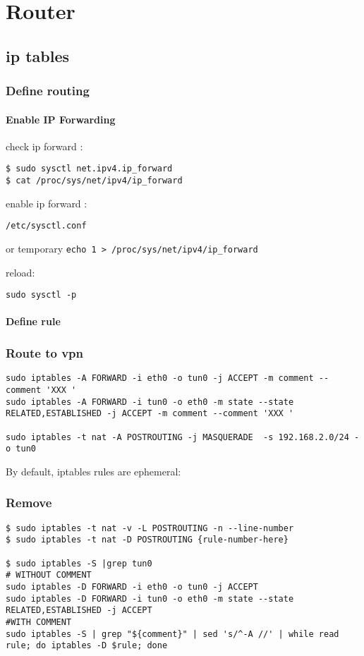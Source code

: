 \chapter{Router}

\section{ip tables}
\subsection{Define routing}
\subsubsection{Enable IP Forwarding}
check ip forward :
\begin{verbatim}
$ sudo sysctl net.ipv4.ip_forward
$ cat /proc/sys/net/ipv4/ip_forward
\end{verbatim}


enable ip forward :

\begin{verbatim}
/etc/sysctl.conf
\end{verbatim}


or temporary \verb+echo 1 > /proc/sys/net/ipv4/ip_forward+

reload:
\begin{verbatim}
sudo sysctl -p
\end{verbatim}


\subsubsection{Define rule}

\subsection{Route to vpn}
\begin{verbatim}
sudo iptables -A FORWARD -i eth0 -o tun0 -j ACCEPT -m comment --comment 'XXX '
sudo iptables -A FORWARD -i tun0 -o eth0 -m state --state RELATED,ESTABLISHED -j ACCEPT -m comment --comment 'XXX '

sudo iptables -t nat -A POSTROUTING -j MASQUERADE  -s 192.168.2.0/24 -o tun0 
\end{verbatim}

By default, iptables rules are ephemeral:

\subsection{Remove}
\begin{verbatim}
$ sudo iptables -t nat -v -L POSTROUTING -n --line-number
$ sudo iptables -t nat -D POSTROUTING {rule-number-here}

$ sudo iptables -S |grep tun0
# WITHOUT COMMENT
sudo iptables -D FORWARD -i eth0 -o tun0 -j ACCEPT
sudo iptables -D FORWARD -i tun0 -o eth0 -m state --state RELATED,ESTABLISHED -j ACCEPT
#WITH COMMENT
sudo iptables -S | grep "${comment}" | sed 's/^-A //' | while read rule; do iptables -D $rule; done
\end{verbatim}


